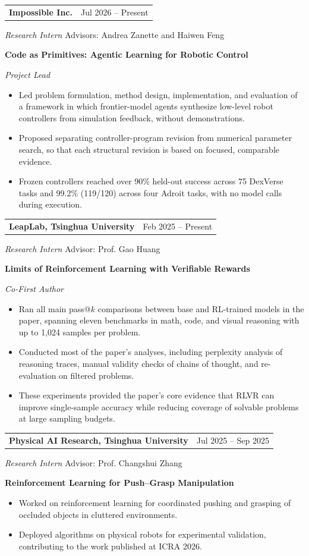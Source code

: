 \documentclass[11pt,letterpaper]{article}
\makeatletter
\newcommand{\headerrow}[2]{%
    \begin{tabular*}{\linewidth}{@{}l@{\extracolsep{\fill}}r@{}}
        #1 & #2 \\
    \end{tabular*}\par
}
\makeatother
\begin{document}
\headerrow{\textbf{Impossible Inc.}}{Jul 2026 -- Present}
\textit{Research Intern} \hfill Advisors: Andrea Zanette and Haiwen Feng\par
\textbf{Code as Primitives: Agentic Learning for Robotic Control}\par
\textit{Project Lead}
\begin{itemize}
    \item Led problem formulation, method design, implementation, and evaluation of a framework in which frontier-model agents synthesize low-level robot controllers from simulation feedback, without demonstrations.
    \item Proposed separating controller-program revision from numerical parameter search, so that each structural revision is based on focused, comparable evidence.
    \item Frozen controllers reached over 90\% held-out success across 75 DexVerse tasks and 99.2\% (119/120) across four Adroit tasks, with no model calls during execution.
\end{itemize}

\headerrow{\textbf{LeapLab, Tsinghua University}}{Feb 2025 -- Present}
\textit{Research Intern} \hfill Advisor: Prof. Gao Huang\par
\textbf{Limits of Reinforcement Learning with Verifiable Rewards}\par
\textit{Co-First Author}
\begin{itemize}
    \item Ran all main pass@$k$ comparisons between base and RL-trained models in the paper, spanning eleven benchmarks in math, code, and visual reasoning with up to 1,024 samples per problem.
    \item Conducted most of the paper's analyses, including perplexity analysis of reasoning traces, manual validity checks of chains of thought, and re-evaluation on filtered problems.
    \item These experiments provided the paper's core evidence that RLVR can improve single-sample accuracy while reducing coverage of solvable problems at large sampling budgets.
\end{itemize}

\headerrow{\textbf{Physical AI Research, Tsinghua University}}{Jul 2025 -- Sep 2025}
\textit{Research Intern} \hfill Advisor: Prof. Changshui Zhang\par
\textbf{Reinforcement Learning for Push--Grasp Manipulation}
\begin{itemize}
    \item Worked on reinforcement learning for coordinated pushing and grasping of occluded objects in cluttered environments.
    \item Deployed algorithms on physical robots for experimental validation, contributing to the work published at ICRA 2026.
\end{itemize}
\end{document}
